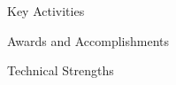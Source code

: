 \documentclass{resume}
\begin{document}

\begin{rSection}{Key Activities}

\end{rSection}


\begin{rSection}{Awards and Accomplishments}

\end{rSection}


\begin{rSection}{Technical Strengths}

\end{rSection}
\end{document}
